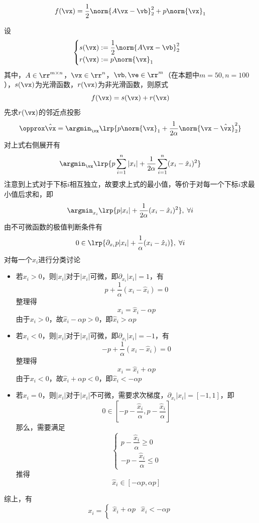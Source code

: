 \begin{example}[LASSO]
    \[f(\vx)=\frac{1}{2}\norm{A\vx-\vb}_2^2+p\norm{\vx}_1\]
\end{example}
\begin{analysis}
    设
    \[\begin{cases}
    s(\vx):=\dfrac{1}{2}\norm{A\vx-\vb}_2^2\\
    r(\vx):=p\norm{\vx}_1
    \end{cases}\]
    其中，$A\in\rr^{m\times n}$，$\vx\in\rr^n$，$\vb,\ve\in\rr^m$（在本题中$m=50,n=100$），$s(\vx)$为光滑函数，$r(\vx)$为非光滑函数，则原式
    \[f(\vx)=s(\vx)+r(\vx)\]
    先求$r(\vx)$的邻近点投影
    \[\opprox \hat{\vx}=\argmin_\vx\lrp{p\norm{\vx}_1+\frac{1}{2\alpha}\norm{\vx-\hat{\vx}}_2^2}\]
    对上式右侧展开有
    \[\argmin_\vx\lrp{p\sum_{i=1}^n|x_i|+\frac{1}{2\alpha}\sum_{i=1}^n(x_i-\hat{x}_i)^2}\]
    注意到上式对于下标$i$相互独立，故要求上式的最小值，等价于对每一个下标$i$求最小值后求和，即
    \[\argmin_{x_i}\lrp{p|x_i|+\frac{1}{2\alpha}(x_i-\hat{x}_i)^2},\;\forall i\]
    由不可微函数的极值判断条件有
    \[0\in\lrp{\partial_{x_i}p|x_i|+\frac{1}{\alpha}(x_i-\hat{x}_i)},\;\forall i\]
    对每一个$x_i$进行分类讨论
    \begin{itemize}
        \item 若$x_i>0$，则$|x_i|$对于$|x_i|$可微，即$\partial_{x_i}|x_i|=1$，有
        \[p+\frac{1}{\alpha}(x_i-\hat{x}_i)=0\]
        整理得
        \[x_i=\hat{x}_i-\alpha p\]
        由于$x_i>0$，故$\hat{x}_i-\alpha p>0$，即$\hat{x}_i>\alpha p$
        \item 若$x_i<0$，则$|x_i|$对于$|x_i|$可微，即$\partial_{x_i}|x_i|=-1$，有
        \[-p+\frac{1}{\alpha}(x_i-\hat{x}_i)=0\]
        整理得
        \[x_i=\hat{x}_i+\alpha p\]
        由于$x_i<0$，故$\hat{x}_i+\alpha p<0$，即$\hat{x}_i<-\alpha p$
        \item 若$x_i=0$，则$|x_i|$对于$|x_i|$不可微，需要求次梯度，$\partial_{x_i}|x_i|=[-1,1]$，即
        \[0\in\left[-p-\frac{\hat{x}_i}{\alpha},p-\frac{\hat{x}_i}{\alpha}\right]\]
        那么，需要满足
        \[\begin{cases}
        p-\dfrac{\hat{x}_i}{\alpha}\geq 0\\
        -p-\dfrac{\hat{x}_i}{\alpha}\leq 0
        \end{cases}\]
        推得
        \[\hat{x}_i\in[-\alpha p,\alpha p]\]
    \end{itemize}
    综上，有
    \[x_i=\begin{cases}
    \hat{x}_i+\alpha p & \hat{x}_i<-\alpha p\\

\end{cases}\]
\end{analysis}
